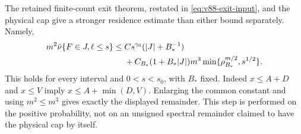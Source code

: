 The retained finite-count exit theorem, restated in
\eqref{eq:v88-exit-input}, and the physical cap give a stronger
residence estimate than either bound separately. Namely,
\begin{align}
 m^2\bar\nu\{F\in J,\ell\le s\}
 \le{}& Cs^{\gamma_0}(|J|+B_*^{-1})\notag\\
 &+C_{B_*}(1+B_*|J|)m^3
                         \min\{\rho_{B_*}^{m/2},s^{1/2}\}.
                                      \label{eq:v88-capped-residence}
\end{align}
This holds for every interval and $0<s<s_0$, with $B_*$ fixed.
Indeed $x\le A+D$ and $x\le V$ imply
$x\le A+\min(D,V)$. Enlarging the common constant and using
$m^2\le m^3$ gives exactly the displayed remainder. This step is
performed on the positive probability, not on an unsigned spectral
remainder claimed to have the physical cap by itself.

